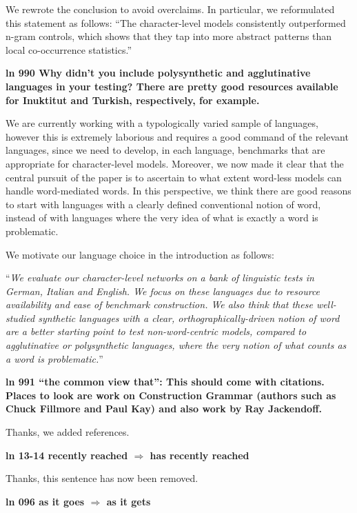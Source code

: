 \documentclass{article}[11pt,a4paper,oneside]
\begin{document}
We rewrote the conclusion to avoid overclaims. In particular, we reformulated this statement as follows: ``The character-level models consistently outperformed n-gram controls, which shows that they tap into more abstract patterns than local co-occurrence statistics.''
\newline

\textbf{ln 990 Why didn't you include polysynthetic and agglutinative languages in your testing? There are pretty good resources available for Inuktitut and Turkish, respectively, for example.}

We are currently working with a typologically varied sample of languages, however this is extremely laborious and requires a good command of the relevant languages, since we need to develop, in each language, benchmarks that are appropriate for character-level models. Moreover, we now made it clear that the central pursuit of the paper is to ascertain to what extent word-less models can handle word-mediated words. In this perspective, we think there are good reasons to start with languages with a clearly defined conventional notion of word, instead of with languages where the very idea of what is exactly a word is problematic.

We motivate our language choice in the introduction as follows:

``\textit{We evaluate our character-level networks on a bank of linguistic tests in German, Italian and English. We focus on these languages due to resource availability and ease of benchmark construction. We also think that these well-studied synthetic languages with a clear, orthographically-driven notion of word are a better starting point to test non-word-centric models, compared to agglutinative or polysynthetic languages, where the very notion of what counts as a word is problematic.}''
\newline

\textbf{ln 991 ``the common view that'': This should come with citations. Places to look are work on Construction Grammar (authors such as Chuck Fillmore and Paul Kay) and also work by Ray Jackendoff.}

Thanks, we added references.
\newline

\textbf{ln 13-14 recently reached $\Rightarrow$ has recently reached}

Thanks, this sentence has now been removed.
\newline

\textbf{ln 096 as it goes $\Rightarrow$ as it gets}
\end{document}
